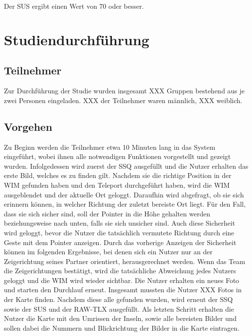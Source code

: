 \begin{hypothesis}
\label{hyp:test}
Der SUS ergibt einen Wert von 70 oder besser.
\end{hypothesis}


\section{Studiendurchführung}
\subsection{Teilnehmer}
Zur Durchführung der Studie wurden insgesamt XXX Gruppen bestehend aus je zwei Personen eingeladen. XXX der Teilnehmer waren männlich, XXX weiblich.

\subsection{Vorgehen}
Zu Beginn werden die Teilnehmer etwa 10 Minuten lang in das System eingeführt, wobei ihnen alle notwendigen Funktionen vorgestellt und gezeigt wurden.
Infolgedessen wird zuerst der SSQ ausgefüllt und die Nutzer erhalten das erste Bild, welches es zu finden gilt. Nachdem sie die richtige Position in der WIM gefunden haben und den Teleport durchgeführt haben, wird die WIM ausgeblendet und der aktuelle Ort geloggt. Daraufhin wird abgefragt, ob sie sich erinnern können, in welcher Richtung der zuletzt bereiste Ort liegt. Für den Fall, dass sie sich sicher sind, soll der Pointer in die Höhe gehalten werden beziehungsweise nach unten, falls sie sich unsicher sind. Auch diese Sicherheit wird geloggt, bevor die Nutzer die tatsächlich vermutete Richtung durch eine Geste mit dem Pointer anzeigen. Durch das vorherige Anzeigen der Sicherheit können im folgenden Ergebnisse, bei denen sich ein Nutzer nur an der Zeigerichtung seines Partner orientiert, herausgerechnet werden.
Wenn das Team die Zeigerichtungen bestätigt, wird die tatsächliche Abweichung jedes Nutzers geloggt und die WIM wird wieder sichtbar. Die Nutzer erhalten ein neues Foto und starten den Durchlauf erneut.
Insgesamt mussten die Nutzer XXX Fotos in der Karte finden.
Nachdem diese alle gefunden wurden, wird erneut der SSQ sowie der SUS und der RAW-TLX ausgefüllt.
Als letzten Schritt erhalten die Nutzer die Karte mit den Umrissen der Inseln, sowie alle bereisten Bilder und sollen dabei die Nummern und Blickrichtung der Bilder in die Karte eintragen. 
